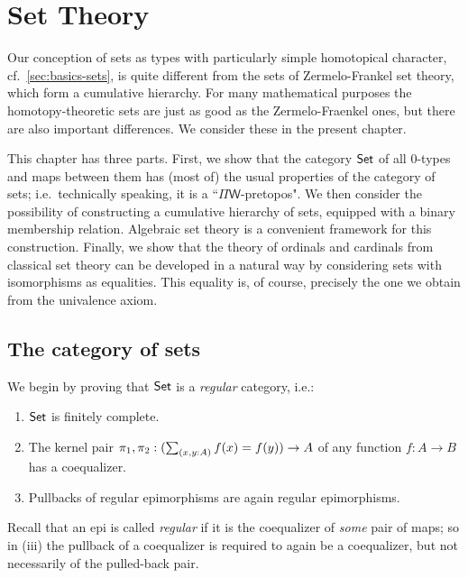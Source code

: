 \newcommand{\vset}{\mathsf{set}}  %

\chapter{Set Theory}
\label{cha:set-math}

Our conception of sets as types with particularly simple homotopical character, cf.\
\autoref{sec:basics-sets}, is quite different from the sets of Zermelo-Frankel set theory, which form a
cumulative hierarchy. For many mathematical purposes the homotopy-theoretic sets are just as good as
the Zermelo-Fraenkel ones, but there are also important differences. We consider these in
the present chapter. 

This chapter has three parts. First, we show that the category $\mathsf{Set}$ of all $0$-types and maps between them has (most of) the usual properties of the category of sets; i.e.\ technically speaking, it is a ``$\Pi\mathsf{W}$-pretopos".  We then  consider the possibility of constructing a cumulative hierarchy of sets, equipped with a binary membership relation. Algebraic set theory is a convenient framework for this construction. Finally, we show that the theory of ordinals and cardinals from classical set theory can be developed in a natural way by considering sets with isomorphisms as equalities. This equality is, of course, precisely the one we obtain from the univalence axiom.

\section{The category of sets}
\label{sec:piw-pretopos}

We begin by proving that $\mathsf{Set}$ is a \emph{regular} category, i.e.:
%
\begin{enumerate}
\item $\mathsf{Set}$ is finitely complete.
\item The kernel pair $\pi_1,\pi_2: (\sm{x,y:A} f(x)= f(y)) \to A$ of any
      function $f : A \to B$ has a coequalizer.
\item Pullbacks of regular epimorphisms are again regular epimorphisms.
\end{enumerate}
%
Recall that an epi is called \emph{regular} if it is the coequalizer of \emph{some} pair of maps; so in (iii) the pullback of a coequalizer is required to again be a coequalizer, but not necessarily of the pulled-back pair. 

